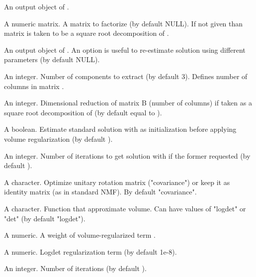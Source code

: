\documentclass[letterpaper]{book}
\begin{document}
%
\begin{Arguments}
\begin{ldescription}
\item[\code{vol}] An output object of .

\item[\code{B}] A numeric matrix. A matrix to factorize (by default NULL). If not given than matrix  is taken to be a square root decomposition of .

\item[\code{volnmf}] An output object of . An option is useful to re-estimate solution using different parameters (by default NULL).

\item[\code{n.comp}] An integer. Number of components to extract (by default 3). Defines number of columns in matrix .

\item[\code{n.reduce}] An integer. Dimensional reduction of matrix B (number of columns) if taken as a square root decomposition of  (by default equal to ).

\item[\code{do.nmf}] A boolean. Estimate standard solution with  as initialization before applying volume regularization (by default ).

\item[\code{iter.nmf}] An integer. Number of iterations to get solution with  if the former requested (by default ).

\item[\code{domain}] A character. Optimize unitary rotation matrix  ("covariance") or keep it as identity matrix (as in standard NMF). By default "covariance".

\item[\code{volf}] A character. Function that approximate volume. Can have values of "logdet" or "det" (by default "logdet").

\item[\code{wvol}] A numeric. A weight of volume-regularized term .

\item[\code{delta}] A numeric. Logdet regularization term  (by default 1e-8).

\item[\code{n.iter}] An integer. Number of iterations (by default ).


\end{ldescription}
\end{Arguments}
\end{document}
